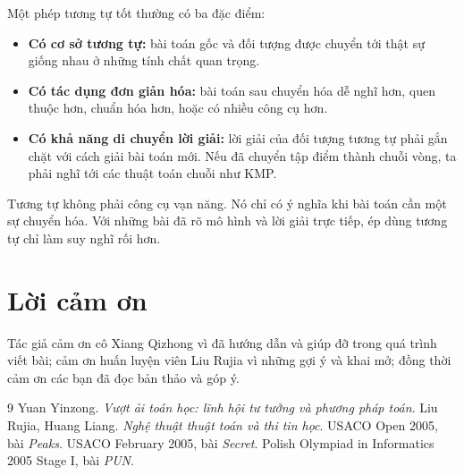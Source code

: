 \documentclass[11pt]{article}
\begin{document}
Một phép tương tự tốt thường có ba đặc điểm:
\begin{itemize}
  \item \textbf{Có cơ sở tương tự:} bài toán gốc và đối tượng được chuyển tới
  thật sự giống nhau ở những tính chất quan trọng.
  \item \textbf{Có tác dụng đơn giản hóa:} bài toán sau chuyển hóa dễ nghĩ
  hơn, quen thuộc hơn, chuẩn hóa hơn, hoặc có nhiều công cụ hơn.
  \item \textbf{Có khả năng di chuyển lời giải:} lời giải của đối tượng tương
  tự phải gắn chặt với cách giải bài toán mới. Nếu đã chuyển tập điểm thành
  chuỗi vòng, ta phải nghĩ tới các thuật toán chuỗi như KMP.
\end{itemize}

Tương tự không phải công cụ vạn năng. Nó chỉ có ý nghĩa khi bài toán cần một
sự chuyển hóa. Với những bài đã rõ mô hình và lời giải trực tiếp, ép dùng
tương tự chỉ làm suy nghĩ rối hơn.

\section*{Lời cảm ơn}

Tác giả cảm ơn cô Xiang Qizhong vì đã hướng dẫn và giúp đỡ trong quá trình
viết bài; cảm ơn huấn luyện viên Liu Rujia vì những gợi ý và khai mở; đồng
thời cảm ơn các bạn đã đọc bản thảo và góp ý.

\begin{thebibliography}{9}
Yuan Yinzong. \emph{Vượt ải toán học: lĩnh hội tư tưởng và phương pháp toán}.
Liu Rujia, Huang Liang. \emph{Nghệ thuật thuật toán và thi tin học}.
USACO Open 2005, bài \emph{Peaks}.
USACO February 2005, bài \emph{Secret}.
Polish Olympiad in Informatics 2005 Stage I, bài \emph{PUN}.
\end{thebibliography}
\end{document}
